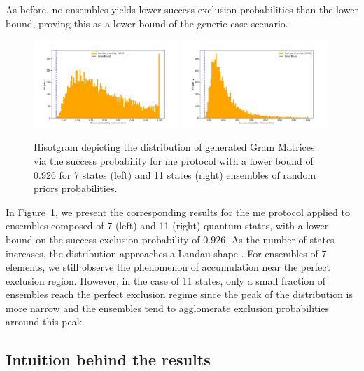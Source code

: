 \documentclass[12pt,letterpaper]{article}
\begin{document}
As before, no ensembles yields lower success exclusion probabilities than the lower bound, proving this as a lower bound of the generic case scenario.

\begin{figure}[H]
	\centering
	\includegraphics[width=0.49\textwidth, trim={1.0cm 0.3cm 2.4cm 1.5cm}, clip]{../Plots/ExclusionMinimumErrorRandomDistributionZ7Prob0.924.pdf}
	\includegraphics[width=0.49\textwidth, trim={1.0cm 0.3cm 2.4cm 1.5cm}, clip]{../Plots/ExclusionMinimumErrorRandomDistributionZ11Prob0.926.pdf}
	\caption{Hisotgram depicting the distribution of generated Gram Matrices via the success probability for \gls{me} protocol with a lower bound of 0.926 for 7 states (left) and 11 states (right) ensembles of random priors probabilities.}
	\label{FigureDistZ7Z11}
\end{figure}
In Figure~\ref{FigureDistZ7Z11}, we present the corresponding results for the \gls{me} protocol applied to ensembles composed of 7 (left) and 11 (right) quantum states, with a lower bound on the success exclusion probability of 0.926. As the number of states increases, the distribution approaches a Landau shape \cite{landau}. For ensembles of 7 elements, we still observe the phenomenon of accumulation near the perfect exclusion region. However, in the case of 11 states, only a small fraction of ensembles reach the perfect exclusion regime since the peak of the distribution is more narrow and the ensembles tend to agglomerate exclusion probabilities arround this peak.


\subsection{Intuition behind the results}
\end{document}

